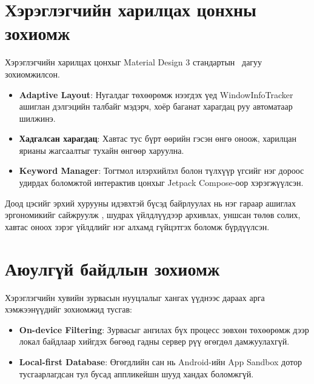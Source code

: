 \section{Хэрэглэгчийн харилцах цонхны зохиомж}
Хэрэглэгчийн харилцах цонхыг Material Design 3 стандартын~\cite{material_design} дагуу зохиомжилсон.
\begin{itemize}
    \item \textbf{Adaptive Layout}: Нугалдаг төхөөрөмж нээгдэх үед WindowInfoTracker ашиглан дэлгэцийн талбайг мэдэрч, хоёр баганат харагдац руу автоматаар шилжинэ.
    \item \textbf{Хадгалсан харагдац}: Хавтас тус бүрт өөрийн гэсэн өнгө оноож, харилцан ярианы жагсаалтыг тухайн өнгөөр харуулна.
    \item \textbf{Keyword Manager}: Тогтмол илэрхийлэл болон түлхүүр үгсийг нэг дороос удирдах боломжтой интерактив цонхыг Jetpack Compose-оор хэрэгжүүлсэн.
\end{itemize}

Доод цэсийг эрхий хурууны идэвхтэй бүсэд байрлуулах нь нэг гараар ашиглах эргономикийг сайжруулж \cite{hurff2016thumb}, шудрах үйлдлүүдээр архивлах, уншсан төлөв солих, хавтас оноох зэрэг үйлдлийг нэг алхамд гүйцэтгэх боломж бүрдүүлсэн.

\section{Аюулгүй байдлын зохиомж}
Хэрэглэгчийн хувийн зурвасын нууцлалыг хангах үүднээс дараах арга хэмжээнүүдийг зохиомжид тусгав:
\begin{itemize}
    \item \textbf{On-device Filtering}: Зурвасыг ангилах бүх процесс зөвхөн төхөөрөмж дээр локал байдлаар хийгдэх бөгөөд гадны сервер рүү өгөгдөл дамжуулахгүй.
    \item \textbf{Local-first Database}: Өгөгдлийн сан нь Android-ийн App Sandbox \cite{android_app_sandbox} дотор тусгаарлагдсан тул бусад аппликейшн шууд хандах боломжгүй.
\end{itemize}

